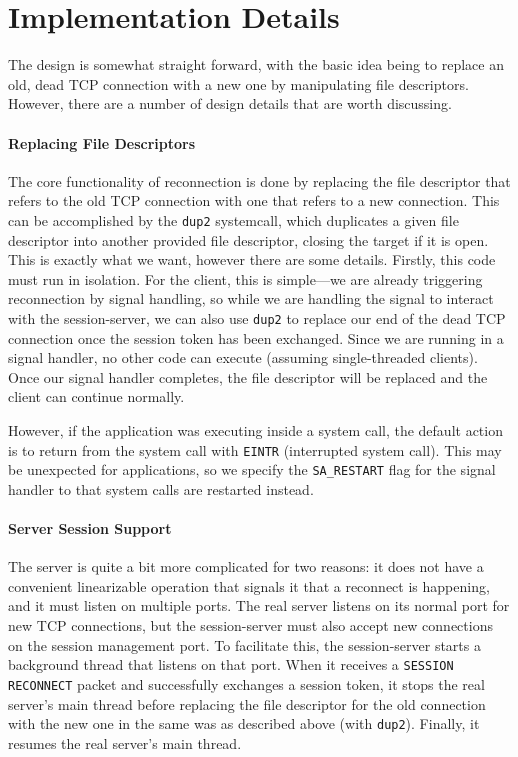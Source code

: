 \documentclass[twocolumn,10pt]{article}
\begin{document}
\section{Implementation Details}
\label{sec:impl}

The design is somewhat straight forward, with the basic idea being to replace an
old, dead TCP connection with a new one by manipulating file descriptors.
However, there are a number of design details that are worth discussing.

\paragraph{Replacing File Descriptors}
The core functionality of reconnection is done by replacing the file descriptor
that refers to the old TCP connection with one that refers to a new connection.
This can be accomplished by the \texttt{dup2} systemcall, which duplicates a
given file descriptor into another provided file descriptor, closing the target
if it is open. This is exactly what we want, however there are some details.
Firstly, this code must run in isolation. For the client, this is simple---we
are already triggering reconnection by signal handling, so while we are handling
the signal to interact with the session-server, we can also use \texttt{dup2} to
replace our end of the dead TCP connection once the session token has been
exchanged. Since we are running in a signal handler, no other code can execute
(assuming single-threaded clients). Once our signal handler completes, the file
descriptor will be replaced and the client can continue normally.

However, if the application was executing inside a system call, the default
action is to return from the system call with \texttt{EINTR} (interrupted system
call). This may be unexpected for applications, so we specify the
\texttt{SA\_RESTART} flag for the signal handler to that system calls are
restarted instead.


\paragraph{Server Session Support}
The server is quite a bit more complicated for two reasons: it does not have a
convenient linearizable operation that signals it that a reconnect is happening,
and it must listen on multiple ports. The real server listens on its normal port
for new TCP connections, but the session-server must also accept new connections
on the session management port. To facilitate this, the session-server starts a
background thread that listens on that port. When it receives a \texttt{SESSION
RECONNECT} packet and successfully exchanges a session token, it stops the real
server's main thread before replacing the file descriptor for the old connection
with the new one in the same was as described above (with \texttt{dup2}).
Finally, it resumes the real server's main thread.
\end{document}
